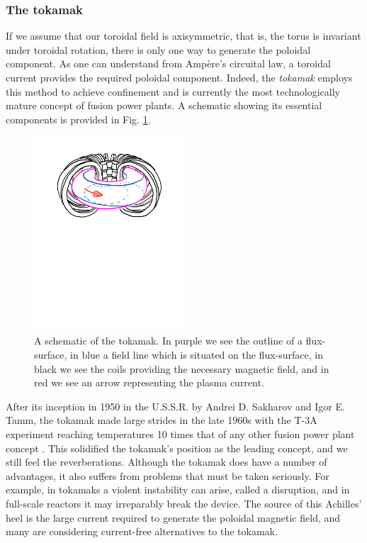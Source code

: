 \subsubsection*{The tokamak}
If we assume that our toroidal field is axisymmetric, that is, the torus is invariant under toroidal rotation, there is only one way to generate the poloidal component. As one can understand from Amp\`ere's circuital law, a toroidal current provides the required poloidal component. Indeed, the \textit{tokamak} employs this method to achieve confinement and is currently the most technologically mature concept of fusion power plants. A schematic showing its essential components is provided in Fig. \ref{fig: tokamak schematic}.
\begin{figure}
    \centering
    \includegraphics[width=0.5\textwidth]{3_chapters/0_introduction/img/tokamak-sketch.pdf}
    \caption{A schematic of the tokamak. In purple we see the outline of a flux-surface, in blue a field line which is situated on the flux-surface, in black we see the coils providing the necessary magnetic field, and in red we see an arrow representing the plasma current.}
    \label{fig: tokamak schematic}
\end{figure}
\par 
After its inception in 1950 in the U.S.S.R. by Andrei D. Sakharov and Igor E. Tamm, the tokamak made large strides in the late 1960s with the T-3A experiment reaching temperatures 10 times that of any other fusion power plant concept \cite{azizov2012tokamaks}. This solidified the tokamak's position as the leading concept, and we still feel the reverberations. Although the tokamak does have a number of advantages, it also suffers from problems that must be taken seriously. For example, in tokamaks a violent instability can arise, called a disruption, and in full-scale reactors it may irreparably break the device. The source of this Achilles' heel is the large current required to generate the poloidal magnetic field, and many are considering current-free alternatives to the tokamak.

